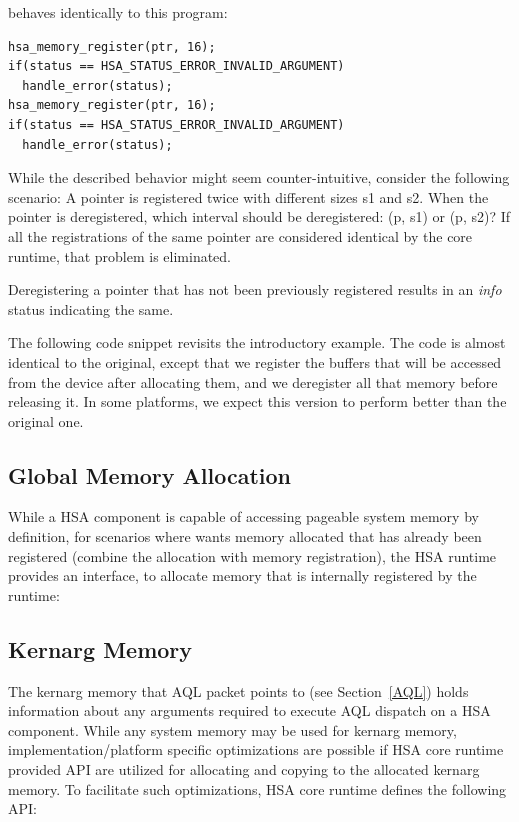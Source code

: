 \documentclass[draft]{book}
\begin{document}
behaves identically to this program:

\begin{lstlisting}
hsa_memory_register(ptr, 16);
if(status == HSA_STATUS_ERROR_INVALID_ARGUMENT)
  handle_error(status);
hsa_memory_register(ptr, 16);
if(status == HSA_STATUS_ERROR_INVALID_ARGUMENT)
  handle_error(status);
\end{lstlisting}

While the described behavior might seem counter-intuitive, consider the
following scenario: A pointer is registered twice with different sizes s1 and
s2. When the pointer is deregistered, which interval should be deregistered: (p,
s1) or (p, s2)? If all the registrations of the same pointer are considered
identical by the core runtime, that problem is eliminated.

Deregistering a pointer that has not been previously registered results in an
\emph{info} status indicating the same.

The following code snippet revisits the introductory example. The code is almost
identical to the original, except that we register the buffers that will be
accessed from the device after allocating them, and we deregister all that
memory before releasing it. In some platforms, we expect this version to perform
better than the original one.


\hypertarget{globalmemory}{}\subsection{Global  Memory Allocation}\label{globalmemory}

While a HSA component is capable of accessing pageable system memory by
definition, for scenarios where wants memory allocated that has already been
registered (combine the allocation with memory registration), the HSA runtime
provides an interface,  to allocate memory that is
internally registered by the runtime:



\hypertarget{kernarg}{}\subsection{Kernarg Memory}\label{kernargmem}

The kernarg memory that AQL packet points to (see Section~\ref{AQL}) holds
information about any arguments required to execute AQL dispatch on a HSA
component. While any system memory may be used for kernarg memory,
implementation/platform specific optimizations are possible if HSA core runtime
provided API are utilized for allocating and copying to the allocated kernarg
memory. To facilitate such optimizations, HSA core runtime defines the following
API:
\end{document}
